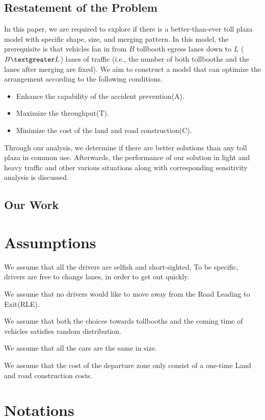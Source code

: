 \documentclass{mcmthesis}
\begin{document}
\subsection{Restatement of the Problem}
In this paper, we are required to explore if there is a
better-than-ever toll plaza model with specific shape,
size, and merging pattern. In this model, the prerequisite
is that vehicles fan in from $B$ tollbooth egress lanes down
to $L$ ($B\textgreater L$) lanes of traffic (i.e., the number of both
tollbooths and the lanes after merging are fixed). We aim
to construct a model that can optimize the arrangement
according to the following conditions.

\begin{itemize}
\item Enhance the capability of the accident prevention(A).
\item Maximize the throughput(T).
\item Minimize the cost of the land and road
construction(C).
\end{itemize}

Through our analysis, we determine if there are better
solutions than any toll plaza in common use. Afterwards,
the performance of our solution in light and heavy traffic
and other various situations along with corresponding
sensitivity analysis is discussed.

\subsection{Our Work}

\section{Assumptions}
\item We assume that all the drivers are selfish and short-sighted.
 To be specific, drivers are free to
 change lanes, in order to get out quickly.
\item We assume that no drivers would like to move away from the Road
Leading to Exit(RLE).
\item 	We assume that both the choices towards tollbooths and the coming time
of vehicles satisfies random distribution.
\item We assume that all the cars are the same in size.
\item We assume that the cost of the departure zone only consist of a one-time
Land and road construction costs.
\section{Notations}
\end{document}
